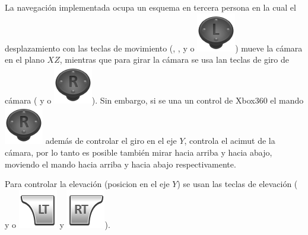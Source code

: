 La navegación implementada ocupa un esquema en tercera persona en la cual el desplazamiento con las teclas de movimiento (, ,  y  o \includegraphics[scale=0.4, trim= 0 20 0 0]{images/visualizer/xbox360/leftStick.png}) mueve la cámara en el plano $XZ$, mientras que para girar la cámara se usa lan teclas de giro de cámara (\keystroke{$\leftarrow$} y \keystroke{$\rightarrow$} o \includegraphics[scale=0.4, trim= 0 20 0 0]{images/visualizer/xbox360/rightStick.png}). Sin embargo, si se una un control de Xbox360\textsuperscript{\textregistered} el mando \includegraphics[scale=0.4, trim= 0 20 0 0]{images/visualizer/xbox360/rightStick.png} además de controlar el giro en el eje $Y$, controla el acimut de la cámara, por lo tanto es posible también mirar hacia arriba y hacia abajo, moviendo el mando hacia arriba y hacia abajo respectivamente.

Para controlar la elevación (posicion en el eje $Y$) se usan las teclas de elevación (\keystroke{$\uparrow$} y \keystroke{$\downarrow$} o \includegraphics[scale=0.4, trim= 0 20 0 0]{images/visualizer/xbox360/leftShoulder1.png} y \includegraphics[scale=0.4, trim= 0 20 0 0]{images/visualizer/xbox360/rightShoulder1.png}).

